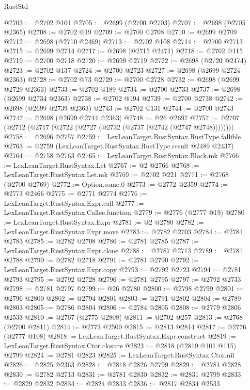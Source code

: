 \begin{lexlean}{RustStd}
\begin{coremodule}
@2703 := @2702 @101
@2705 := @2699 (@2700 @2703)
@2707 := @2698 (@2705 @2365)
@2708 := @2702 @19
@2709 := @2700 @2708
@2710 := @2699 @2709
@2712 := @2698 (@2710 @2469)
@2713 := @2702 @108
@2714 := @2700 @2713
@2715 := @2699 @2714
@2717 := @2698 (@2715 @2471)
@2718 := @2702 @115
@2719 := @2700 @2718
@2720 := @2699 @2719
@2722 := @2698 (@2720 @2474)
@2723 := @2702 @137
@2724 := @2700 @2723
@2727 := @2698 (@2699 @2724 @2363)
@2728 := @2702 @73
@2729 := @2700 @2728
@2732 := @2698 (@2699 @2729 @2363)
@2733 := @2702 @189
@2734 := @2700 @2733
@2737 := @2698 (@2699 @2734 @2363)
@2738 := @2702 @194
@2739 := @2700 @2738
@2742 := @2698 (@2699 @2739 @2363)
@2743 := @2702 @131
@2744 := @2700 @2743
@2747 := @2698 (@2699 @2744 @2363)
@2748 := @26 @2697
@2757 := @2707 (@2712 (@2717 (@2722 (@2727 (@2732 (@2737 (@2742 (@2747 @2748))))))))
@2758 := @2696 @2757
@2759 := LexLeanTarget.RustSyntax.RustType.fallible
@2763 := @2759 (LexLeanTarget.RustSyntax.RustType.result @2489 @2437)
@2764 := @2758 @2763
@2765 := LexLeanTarget.RustSyntax.Block.mk
@2766 := LexLeanTarget.RustSyntax.Let
@2767 := @2 @2766
@2768 := LexLeanTarget.RustSyntax.Let.mk
@2769 := @2702 @221
@2771 := @2768 (@2700 @2769)
@2772 := Option.some.{0}
@2773 := @2772 @2359
@2774 := @2773 @2466
@2775 := @2771 @2774
@2776 := LexLeanTarget.RustSyntax.Expr.call
@2777 := LexLeanTarget.RustSyntax.Callee.function
@2779 := @2776 (@2777 @19)
@2780 := LexLeanTarget.RustSyntax.Expr
@2781 := @2 @2780
@2782 := LexLeanTarget.RustSyntax.Expr.move
@2783 := @2782 @2703
@2784 := @2781 @2783
@2785 := @2782 @2708
@2786 := @2781 @2785
@2787 := LexLeanTarget.RustSyntax.Expr.clone
@2788 := @2787 @2713
@2789 := @2781 @2788
@2790 := @2782 @2718
@2791 := @2781 @2790
@2792 := LexLeanTarget.RustSyntax.Expr.copy
@2793 := @2792 @2723
@2794 := @2781 @2793
@2795 := @2792 @2728
@2796 := @2781 @2795
@2797 := @2792 @2733
@2798 := @2781 @2797
@2799 := @26 @2780
@2800 := @2798 @2799
@2801 := @2796 @2800
@2802 := @2794 @2801
@2803 := @2791 @2802
@2804 := @2789 @2803
@2805 := @2786 @2804
@2806 := @2784 @2805
@2808 := @2779 @2806 @2533
@2810 := @2767 (@2775 @2808)
@2811 := @2702 @257
@2813 := @2768 (@2700 @2811)
@2814 := @2773 @2500
@2815 := @2813 @2814
@2817 := @2776 (@2777 @108)
@2818 := LexLeanTarget.RustSyntax.Expr.construct
@2819 := LexLeanTarget.RustSyntax.Ctor.closure
@2823 := @2818 (@2819 @101 @115) @2799
@2824 := @2781 @2823
@2825 := LexLeanTarget.RustSyntax.Ctor.nil
@2826 := @2825 @2363
@2828 := @2818 @2826 @2799
@2829 := @2781 @2828
@2830 := @2782 @2713
@2831 := @2781 @2830
@2832 := @2831 @2799
@2833 := @2829 @2832
@2834 := @2824 @2833
@2836 := @2817 @2834 @2533

\end{coremodule}
\end{lexlean}
